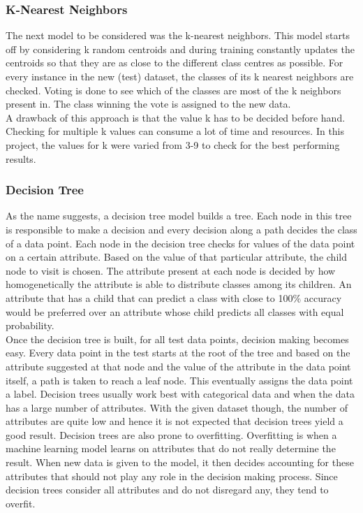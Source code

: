\documentclass[11pt,a4paper]{article}
\begin{document}
\subsubsection{K-Nearest Neighbors}
\label{knn}
The next model to be considered was the k-nearest neighbors. This model starts off by considering k random centroids and during training constantly updates the centroids so that they are as close to the different class centres as possible. For every instance in the new (test) dataset, the classes of its k nearest neighbors are checked. Voting is done to see which of the classes are most of the k neighbors present in. The class winning the vote is assigned to the new data.\\
A drawback of this approach is that the value k has to be decided before hand. Checking for multiple k values can consume a lot of time and resources. In this project, the values for k were varied from 3-9 to check for the best performing results.

\subsubsection{Decision Tree}
\label{dt}
As the name suggests, a decision tree model builds a tree. Each node in this tree is responsible to make a decision and every decision along a path decides the class of a data point. Each node in the decision tree checks for values of the data point on a certain attribute. Based on the value of that particular attribute, the child node to visit is chosen. The attribute present at each node is decided by how homogenetically the attribute is able to distribute classes among its children. An attribute that has a child that can predict a class with close to 100\% accuracy would be preferred over an attribute whose child predicts all classes with equal probability.\\
Once the decision tree is built, for all test data points, decision making becomes easy. Every data point in the test starts at the root of the tree and based on the attribute suggested at that node and the value of the attribute in the data point itself, a path is taken to reach a leaf node. This eventually assigns the data point a label. Decision trees usually work best with categorical data and when the data has a large number of attributes. With the given dataset though, the number of attributes are quite low and hence it is not expected that decision trees yield a good result. Decision trees are also prone to overfitting. Overfitting is when a machine learning model learns on attributes that do not really determine the result. When new data is given to the model, it then decides accounting for these attributes that should not play any role in the decision making process. Since decision trees consider all attributes and do not disregard any, they tend to overfit.
\end{document}
